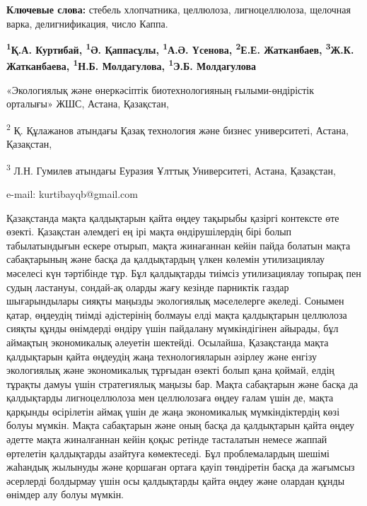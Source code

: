 {\bfseries Ключевые слова:} стебель хлопчатника, целлюлоза, лигноцеллюлоза,
щелочная варка, делигнификация, число Каппа.


\begin{center}
{\bfseries \textsuperscript{1}Қ.А. Куртибай\envelope, \textsuperscript{1}Ә.
Қаппасұлы, \textsuperscript{1}А.Ә. Үсенова, \textsuperscript{2}Е.Е.
Жатканбаев, \textsuperscript{3}Ж.К. Жатканбаева, \textsuperscript{1}Н.Б.
Молдагулова, \textsuperscript{1}Э.Б. Молдагулова}

«Экологиялық және өнеркәсіптік биотехнологияның ғылыми-өндірістік
орталығы» ЖШС, Астана, Қазақстан,

\textsuperscript{2} Қ. Құлажанов атындағы Қазақ технология және бизнес
университеті, Астана, Қазақстан,

\textsuperscript{3} Л.Н. Гумилев атындағы Еуразия Ұлттық Университеті,
Астана, Қазақстан,

e-mail: kurtibayqb@gmail.com
\end{center}

Қазақстанда мақта қалдықтарын қайта өңдеу тақырыбы қазіргі контексте өте
өзекті. Қазақстан әлемдегі ең ірі мақта өндірушілердің бірі болып
табылатындығын ескере отырып, мақта жинағаннан кейін пайда болатын мақта
сабақтарының және басқа да қалдықтардың үлкен көлемін утилизациялау
мәселесі күн тәртібінде тұр. Бұл қалдықтарды тиімсіз утилизациялау
топырақ пен судың ластануы, сондай-ақ оларды жағу кезінде парниктік
газдар шығарындылары сияқты маңызды экологиялық мәселелерге әкеледі.
Сонымен қатар, өңдеудің тиімді әдістерінің болмауы елді мақта
қалдықтарын целлюлоза сияқты құнды өнімдерді өндіру үшін пайдалану
мүмкіндігінен айырады, бұл аймақтың экономикалық әлеуетін шектейді.
Осылайша, Қазақстанда мақта қалдықтарын қайта өңдеудің жаңа
технологияларын әзірлеу және енгізу экологиялық және экономикалық
тұрғыдан өзекті болып қана қоймай, елдің тұрақты дамуы үшін стратегиялық
маңызы бар. Мақта сабақтарын және басқа да қалдықтарды лигноцеллюлоза
мен целлюлозаға өңдеу ғалам үшін де, мақта қарқынды өсірілетін аймақ
үшін де жаңа экономикалық мүмкіндіктердің көзі болуы мүмкін. Мақта
сабақтарын және оның басқа да қалдықтарын қайта өңдеу әдетте мақта
жиналғаннан кейін қоқыс ретінде тасталатын немесе жаппай өртелетін
қалдықтарды азайтуға көмектеседі. Бұл проблемалардың шешімі жаһандық
жылынуды және қоршаған ортаға қауіп төндіретін басқа да жағымсыз
әсерлерді болдырмау үшін осы қалдықтарды қайта өңдеу және олардан құнды
өнімдер алу болуы мүмкін.

